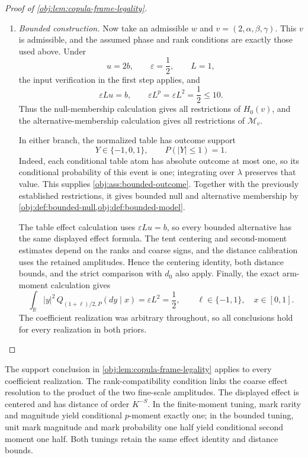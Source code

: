 \documentclass[11pt]{article}
\begin{document}
\begin{proof}[Proof of \cref{obj:lem:copula-frame-legality}]
\begin{enumerate}
\item \textit{Bounded construction.}
Now take an admissible \(w\) and \(v=(2,\alpha,\beta,\gamma)\). This \(v\) is admissible, and the assumed phase and rank conditions are exactly those used above. Under
\[
u=2b,\qquad \varepsilon=\frac12,\qquad L=1,
\]
the input verification in the first step applies, and
\[
\varepsilon Lu=b,\qquad
\varepsilon L^p=\varepsilon L^2=\frac12\le10.
\]
Thus the null-membership calculation gives all restrictions of
\(H_0(v)\), and the alternative-membership calculation gives all restrictions of \(\mathcal M_v\).

In either branch, the normalized table has outcome support
\[
Y\in\{-1,0,1\},
\qquad P(|Y|\le1)=1.
\]
Indeed, each conditional table atom has absolute outcome at most one, so its conditional probability of this event is one; integrating over \(\lambda\) preserves that value. This supplies
\cref{obj:ass:bounded-outcome}. Together with the previously established restrictions, it gives bounded null and alternative membership by
\cref{obj:def:bounded-null,obj:def:bounded-model}.

The table effect calculation uses \(\varepsilon Lu=b\), so every bounded alternative has the same displayed effect formula. The tent centering and second-moment estimates depend on the ranks and coarse signs, and the distance calibration uses the retained amplitudes. Hence the centering identity, both distance bounds, and the strict comparison with \(d_0\) also apply. Finally, the exact arm-moment calculation gives
\[
\int_{\mathbb R}|y|^2
\,Q_{(1+\ell)/2,P}(dy\mid x)
=\varepsilon L^2=\frac12,
\qquad \ell\in\{-1,1\},\quad x\in[0,1].
\]
The coefficient realization was arbitrary throughout, so all conclusions hold for every realization in both priors.
\end{enumerate}
\end{proof}

The support conclusion in \cref{obj:lem:copula-frame-legality} applies to every coefficient realization. The rank-compatibility condition links the coarse effect resolution to the product of the two fine-scale amplitudes. The displayed effect is centered and has distance of order \(K^{-S}\). In the finite-moment tuning, mark rarity and magnitude yield conditional \(p\)-moment exactly one; in the bounded tuning, unit mark magnitude and mark probability one half yield conditional second moment one half. Both tunings retain the same effect identity and distance bounds.
\end{document}
